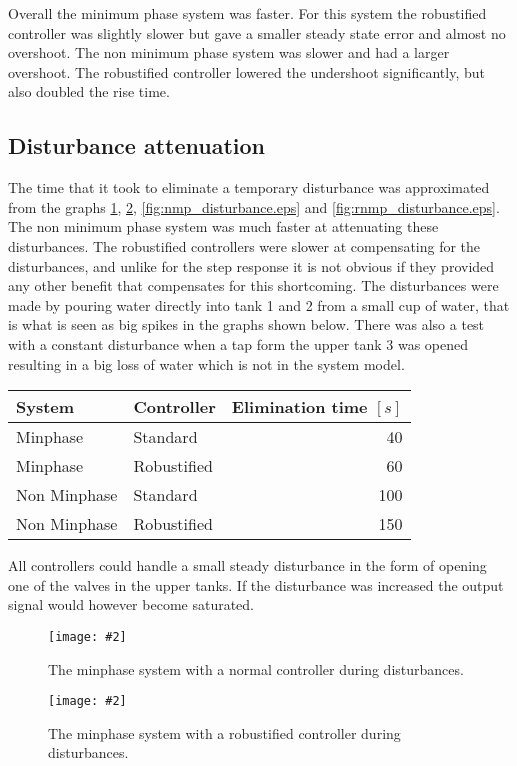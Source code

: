 \documentclass[a4paper,12pt,oneside,onecolumn]{article}
\newcommand{\image}[3][width=.6\columnwidth]{
	\begin{figure}[h!]
		\centering
	    \texttt{[image: \#2]}
		\caption{#3}
		\label{fig:#2}
	\end{figure}
}
\begin{document}
Overall the minimum phase system was faster. For this system the robustified controller was slightly slower but gave a smaller steady state error and almost no overshoot. The non minimum phase system was slower and had a larger overshoot. The robustified controller lowered the undershoot significantly, but also doubled the rise time. 

\subsection{Disturbance attenuation}

The time that it took to eliminate a temporary disturbance was approximated from the graphs \ref{fig:mp_disturbance.eps}, \ref{fig:rmp_disturbance.eps}, \ref{fig:nmp_disturbance.eps} and \ref{fig:rnmp_disturbance.eps}. The non minimum phase system was much faster at attenuating  these disturbances. The robustified controllers were slower at compensating for the disturbances, and unlike for the step response it is not obvious if they provided any other benefit that compensates for this shortcoming. The disturbances were made by pouring water directly into tank 1 and 2 from a small cup of water, that is what is seen as big spikes in the graphs shown below. There was also a test with a constant disturbance when a tap form the upper tank 3 was opened resulting in a big loss of water which is not in the system model.
\begin{center}
    \begin{tabular}{|l|l||r|}
    System & Controller & Elimination time $[s]$\\
    \hline
    Minphase    & Standard      &  40 \\
    Minphase    & Robustified   &  60 \\
    Non Minphase & Standard     &  100\\
    Non Minphase & Robustified  & 150 \\
    \end{tabular}
\end{center}

All controllers could handle a small steady disturbance in the form of opening one of the valves in the upper tanks. If the disturbance was increased the output signal would however become saturated.

\image{mp_disturbance.eps}{The minphase system with a normal controller during disturbances.}

\image{rmp_disturbance.eps}{The minphase system with a robustified controller during disturbances.}
\end{document}

